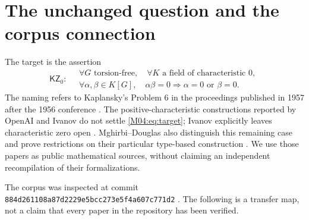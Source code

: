 \documentclass[11pt,a4paper,oneside]{report}
\theoremstyle{definition}
\theoremstyle{remark}
\newcommand{\KZ}{\mathsf{KZ}_0}
\begin{document}
\section{The unchanged question and the corpus connection}

The target is the assertion
\begin{equation}\label{M04:eq:target}
\KZ:\quad\begin{gathered}
\forall G\text{ torsion-free},\quad
\forall K\text{ a field of characteristic }0,\\
\forall\alpha,\beta\in K[G],\quad \alpha\beta=0
\Longrightarrow \alpha=0\text{ or }\beta=0.
\end{gathered}
\end{equation}
The naming refers to Kaplansky's Problem 6 in the proceedings published
in 1957 after the 1956 conference \cite{B:Kaplansky}. The positive-characteristic
constructions reported by OpenAI and Ivanov do not settle
\eqref{M04:eq:target}; Ivanov explicitly leaves characteristic zero open
\cite{B:OpenAI,B:Ivanov}. Mghirbi--Douglas also distinguish this remaining
case and prove restrictions on their particular type-based construction
\cite[Section 8]{B:MD}. We use those papers as public mathematical sources,
without claiming an independent recompilation of their formalizations.

The corpus was inspected at commit
\texttt{884d261108a87d2229e5bcc273e5f4a607c771d2} \cite{B:Corpus}.
The following is a transfer map, not a claim that every paper in the
repository has been verified.
\end{document}
